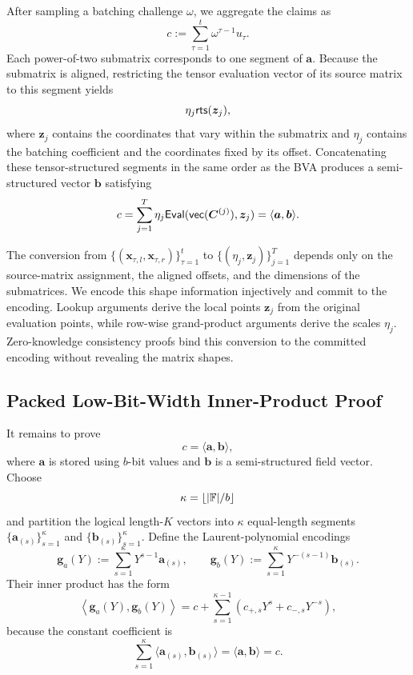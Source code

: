 After sampling a batching challenge \(\omega\), we aggregate the claims as
\[
    c
    :=
    \sum_{\tau=1}^{t}
        \omega^{\tau-1}u_\tau.
\]
Each power-of-two submatrix corresponds to one segment of \(\bm a\).
Because the submatrix is aligned, restricting the tensor evaluation vector of
its source matrix to this segment yields
\[
    \eta_j{\sf rts}(\bm z_j),
\]
where \(\bm z_j\) contains the coordinates that vary within the submatrix and
\(\eta_j\) contains the batching coefficient and the coordinates fixed by its
offset.  Concatenating these tensor-structured segments in the same order as
the BVA produces a semi-structured vector \(\bm b\) satisfying
\[
    c
    =
    \sum_{j=1}^{T}
        \eta_j
        \mathsf{Eval}(
            {\sf vec}(\bm C^{(j)})
        , \bm z_j)
    =
    \langle\bm a,\bm b\rangle.
\]

The conversion from
\(\{(\bm x_{\tau,l},\bm x_{\tau,r})\}_{\tau=1}^{t}\)
to \(\{(\eta_j,\bm z_j)\}_{j=1}^{T}\) depends only on the source-matrix
assignment, the aligned offsets, and the dimensions of the submatrices.
We encode this shape information injectively and commit to the encoding.
Lookup arguments derive the local points \(\bm z_j\) from the original
evaluation points, while row-wise grand-product arguments derive the scales
\(\eta_j\).  Zero-knowledge consistency proofs bind this conversion to the
committed encoding without revealing the matrix shapes.

\subsection{Packed Low-Bit-Width Inner-Product Proof}

It remains to prove
\[
    c=\langle\bm a,\bm b\rangle,
\]
where \(\bm a\) is stored using \(b\)-bit values and \(\bm b\) is a
semi-structured field vector.  Choose
\[
    \kappa=\lfloor |{\mathbb{F}}|/b \rfloor
\]
and partition the logical length-\(K\) vectors into \(\kappa\) equal-length
segments
\(\{\bm a_{(s)}\}_{s=1}^{\kappa}\) and
\(\{\bm b_{(s)}\}_{s=1}^{\kappa}\).  Define the Laurent-polynomial
encodings
\[
    \bm g_a(Y)
    :=
    \sum_{s=1}^{\kappa}
        Y^{s-1}\bm a_{(s)},
    \qquad
    \bm g_b(Y)
    :=
    \sum_{s=1}^{\kappa}
        Y^{-(s-1)}\bm b_{(s)}.
\]
Their inner product has the form
\begin{equation}
\label{eq:packed-ip-overview}
\left\langle
    \bm g_a(Y),\bm g_b(Y)
\right\rangle
=
c+
\sum_{s=1}^{\kappa-1}
\left(
    c_{+,s}Y^s
    +
    c_{-,s}Y^{-s}
\right),
\end{equation}
because the constant coefficient is
\[
    \sum_{s=1}^{\kappa}
        \langle\bm a_{(s)},\bm b_{(s)}\rangle
    =
    \langle\bm a,\bm b\rangle
    =
    c.
\]

